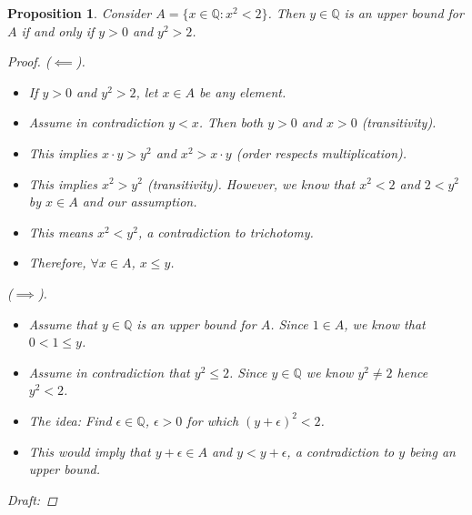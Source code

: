 \documentclass[10pt]{article}
\newcommand{\Q}{\mathbb{Q}}
\newtheorem{proposition}[theorem]{Proposition}
\theoremstyle{definition}
\theoremstyle{remark}
\begin{document}
\begin{proposition}
    Consider $A = \{x \in \Q \colon x^2 < 2\}$. Then $y \in \Q$ is an upper bound for $A$ if and only if $y > 0$ and $y^2 > 2$.
    \begin{proof}
        ($\impliedby$).

        \begin{itemize}
            \item
            If $y > 0$ and $y^2 > 2$, let $x \in A$ be any element.
            \item
            Assume in contradiction $y < x$. Then both $y > 0$ and $x > 0$ (transitivity).
            \item
            This implies $x \cdot y > y^2$ and $x^2 > x \cdot y$ (order respects multiplication).
            \item
            This implies $x^2 > y^2$ (transitivity). However, we know that $x^2 < 2$ and $2 < y^2$ by $x \in A$ and our assumption.
            \item
            This means $x^2 < y^2$, a contradiction to trichotomy.
            \item
            Therefore, $\forall x \in A$, $x \leq y$.
        \end{itemize}


        ($\implies$).
        \begin{itemize}
            \item
        Assume that $y \in \Q$ is an upper bound for $A$.
        Since $1 \in A$, we know that $0 < 1 \leq y$.
            \item
        Assume in contradiction that $y^2 \leq 2$. Since $y \in \Q$ we know $y^2 \neq 2$ hence $y^2 < 2$.
            \item
        The idea: Find $\epsilon \in \Q$, $\epsilon > 0$ for which $(y + \epsilon)^2 < 2$.
            \item
        This would imply that $y + \epsilon \in A$ and $y < y + \epsilon$, a contradiction to $y$ being an upper bound.
        \end{itemize}

        Draft:


\end{proof}
\end{proposition}
\end{document}
